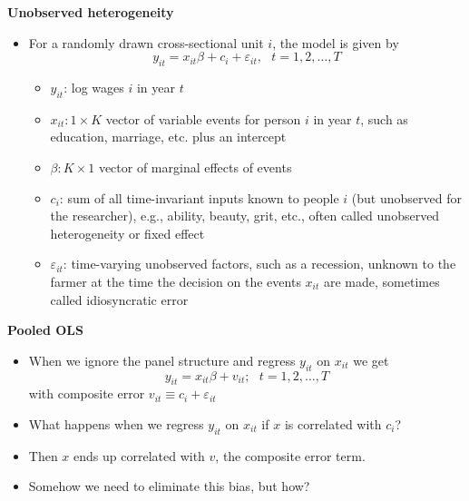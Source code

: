 \documentclass{beamer}
\begin{document}
\begin{frame}[plain]
	\begin{center}
	\textbf{Unobserved heterogeneity}
	\end{center}
	
	\begin{itemize}
	\item For a randomly drawn cross-sectional unit $i$, the model is given by $$y_{it} = x_{it}\beta + c_i + \varepsilon_{it}, \text{   }t=1,2,\dots,T$$
		\begin{itemize}
		\item $y_{it}$: log wages $i$ in year $t$
		\item $x_{it}:1 \times K$ vector of variable events for person $i$ in year $t$, such as education, marriage, etc. plus an intercept
		\item $\beta: K\times 1$ vector of marginal effects of events
		\item $c_i$: sum of all time-invariant inputs known to people $i$ (but unobserved for the researcher), e.g., ability, beauty, grit, etc., often called unobserved heterogeneity or fixed effect
		\item $\varepsilon_{it}$: time-varying unobserved factors, such as a recession, unknown to the farmer at the time the decision on the events $x_{it}$ are made, sometimes called idiosyncratic error
		\end{itemize}
	\end{itemize}
\end{frame}


\begin{frame}
\begin{center}
\textbf{Pooled OLS}
\end{center}

\begin{itemize}
	\item When we ignore the panel structure and regress $y_{it}$ on $x_{it}$ we get$$ y_{it}=x_{it}\beta + v_{it}; \text{    }t=1,2,\dots,T$$with composite error $v_{it} \equiv c_i + \varepsilon_{it}$
	\item What happens when we regress $y_{it}$ on $x_{it}$ if $x$ is correlated with $c_i$?
	\item Then $x$ ends up correlated with $v$, the composite error term.
	\item Somehow we need to eliminate this bias, but how?
\end{itemize}

\end{frame}
\end{document}
